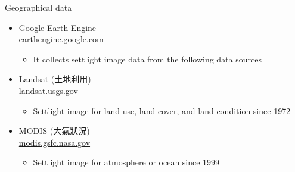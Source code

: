 \documentclass[hyperref={pdfpagelabels=false}]{beamer}
\begin{document}
\begin{frame}{Geographical data}
\begin{itemize}
\item Google Earth Engine \\ \href{https://earthengine.google.com/}{earthengine.google.com}  
\vspace{0.2cm}
\begin{itemize} 
\vspace{0.2cm}
\item It collects settlight image data from the following data sources 
\end{itemize}
\vspace{0.2cm}
\item Landsat (土地利用) \\ \href{https://landsat.usgs.gov/}{landsat.usgs.gov}  
\vspace{0.2cm}
\begin{itemize} 
\vspace{0.2cm}
\item Settlight image for land use, land cover, and land condition since 1972 
\end{itemize}
\vspace{0.2cm}
\item MODIS (大氣狀況) \\ \href{https://modis.gsfc.nasa.gov/}{modis.gsfc.nasa.gov}  
\vspace{0.2cm}
\begin{itemize} 
\vspace{0.2cm}
\item Settlight image for atmosphere or ocean since 1999 
\end{itemize}



\end{itemize}
\end{frame}
\end{document}
